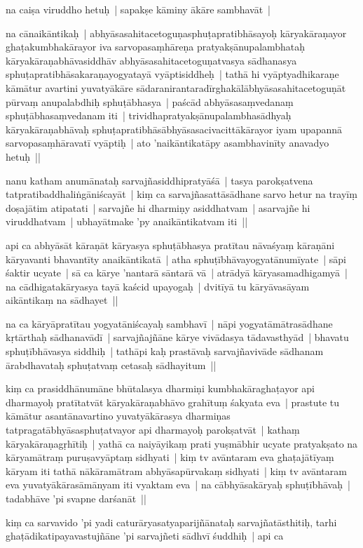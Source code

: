 \documentclass[article,12pt,a4paper]{memoir}
\begin{document}
	  \pstart na caiṣa viruddho hetuḥ | sapakṣe kāminy ākāre sambhavāt | 
	\pend
      

	  \pstart na cānaikāntikaḥ | abhyāsasahitacetoguṇasphuṭapratibhāsayoḥ kāryakāraṇayor ghaṭakumbhakārayor iva sarvopasaṃhāreṇa pratyakṣānupalambhataḥ kāryakāraṇabhāvasiddhāv abhyāsasahitacetoguṇatvasya sādhanasya sphuṭapratibhāsakaraṇayogyatayā vyāptisiddheḥ | tathā hi vyāptyadhikaraṇe kāmātur avartini yuvatyākāre sādaranirantaradīrghakālābhyāsasahitacetoguṇāt pūrvaṃ anupalabdhiḥ sphuṭābhasya | paścād abhyāsasaṃvedanaṃ sphuṭābhasaṃvedanam iti | trividhapratyakṣānupalambhasādhyaḥ kāryakāraṇabhāvaḥ sphuṭapratibhāsābhyāsasacivacittākārayor iyam upapannā sarvopasaṃhāravatī vyāptiḥ | ato 'naikāntikatāpy asambhavinīty anavadyo hetuḥ || 
	\pend
      

	  \pstart nanu katham anumānataḥ sarvajñasiddhipratyāśā | tasya parokṣatvena tatpratibaddhaliṅgāniścayāt | kiṃ ca sarvajñasattāsādhane sarvo hetur na trayīṃ doṣajātim atipatati | sarvajñe hi dharmiṇy asiddhatvam | asarvajñe hi viruddhatvam | ubhayātmake 'py anaikāntikatvam iti || 
	\pend
      

	  \pstart api ca abhyāsāt kāraṇāt kāryasya sphuṭābhasya pratītau nāvaśyaṃ kāraṇāni kāryavanti bhavantīty anaikāntikatā | atha sphuṭībhāvayogyatānumīyate | sāpi śaktir ucyate | sā ca kārye 'nantarā sāntarā vā | atrādyā kāryasamadhigamyā | na cādhigatakāryasya tayā kaścid upayogaḥ | dvitīyā tu kāryāvasāyam aikāntikaṃ na sādhayet || 
	\pend
      

	  \pstart na ca kāryāpratītau yogyatāniścayaḥ sambhavī | nāpi yogyatāmātrasādhane kṛtārthaḥ sādhanavādī | sarvajñajñāne kārye vivādasya tādavasthyād | bhavatu sphuṭībhāvasya siddhiḥ | tathāpi kaḥ prastāvaḥ sarvajñavivāde sādhanam ārabdhavataḥ sphuṭatvaṃ cetasaḥ sādhayitum || 
	\pend
      

	  \pstart kiṃ ca prasiddhānumāne bhūtalasya dharmiṇi kumbhakāraghaṭayor api dharmayoḥ pratītatvāt kāryakāraṇabhāvo grahītuṃ śakyata eva | prastute tu kāmātur asantānavartino yuvatyākārasya dharmiṇas tatpragatābhyāsasphuṭatvayor api dharmayoḥ parokṣatvāt | kathaṃ kāryakāraṇagṛhītiḥ | yathā ca naiyāyikaṃ prati yuṣmābhir ucyate pratyakṣato na kāryamātraṃ puruṣavyāptaṃ sidhyati | kiṃ tv avāntaram eva ghaṭajātīyaṃ kāryam iti tathā nākāramātram abhyāsapūrvakaṃ sidhyati | kiṃ tv avāntaram eva yuvatyākārasāmānyam iti vyaktam eva | na cābhyāsakāryaḥ sphuṭībhāvaḥ | tadabhāve 'pi svapne darśanāt || 
	\pend
      

	  \pstart kiṃ ca sarvavido 'pi yadi caturāryasatyaparijñānataḥ sarvajñatāsthitiḥ, tarhi ghaṭādikatipayavastujñāne 'pi sarvajñeti sādhvī śuddhiḥ | api ca 
	\pend
      
\end{document}
